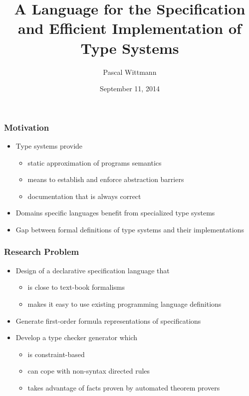 \documentclass{beamer}
\title{A Language for the Specification and Efficient Implementation
  of Type Systems}
\author{Pascal Wittmann}
\institute{TU Darmstadt}
\date{September 11, 2014}
\begin{document}
\begin{frame}[plain]
  \titlepage{}
\end{frame}

\begin{frame}
  \frametitle{Motivation}
  \begin{itemize}
  \item Type systems provide
    \begin{itemize}
    \item static approximation of programs semantics
    \item means to establish and enforce abstraction barriers
    \item documentation that is always correct
    \end{itemize}
  \item Domains specific languages benefit from specialized type
    systems
  \item Gap between formal definitions of type systems and their
    implementations
  \end{itemize}
\end{frame}

\begin{frame}
  \frametitle{Research Problem}
  \begin{itemize}
  \item Design of a declarative specification language that
    \begin{itemize}
    \item is close to text-book formalisms
    \item makes it easy to use existing programming language definitions
    \end{itemize}
  \item Generate first-order formula representations of specifications
  \item Develop a type checker generator which
    \begin{itemize}
    \item is constraint-based
    \item can cope with non-syntax directed rules
    \item takes advantage of facts proven by automated theorem provers
    \end{itemize}
  \end{itemize}
\end{frame}
\end{document}
